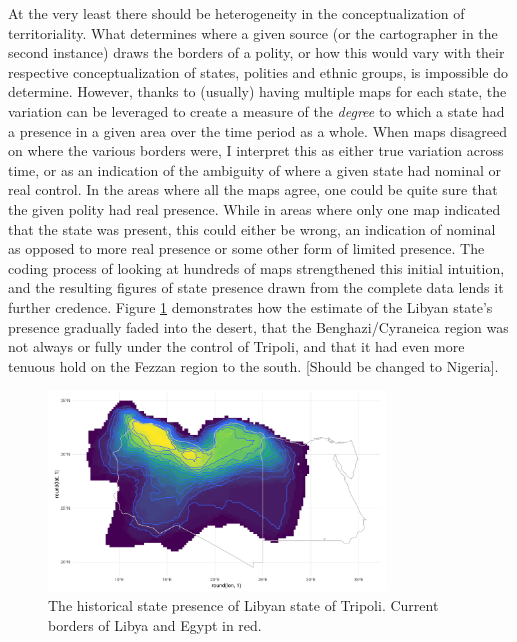 \documentclass[12pt]{article}
\begin{document}
At the very least there should be heterogeneity in the conceptualization of
territoriality. What determines where a given source (or the cartographer in the
second instance) draws the borders of a polity, or how this would vary with
their respective conceptualization of states, polities and ethnic groups, is
impossible do determine. However, thanks to (usually) having multiple maps for
each state, the variation can be leveraged to create a measure of the
\textit{degree} to which a state had a presence in a given area over the time
period as a whole. When maps disagreed on where the various borders were, I
interpret this as either true variation across time, or as an indication of the
ambiguity of where a given state had nominal or real control. In the areas where
all the maps agree, one could be quite sure that the given polity had real
presence.  While in areas where only one map indicated that the state was
present, this could either be wrong, an indication of nominal as opposed to more
real presence or some other form of limited presence. The coding process of
looking at hundreds of maps strengthened this initial intuition, and the
resulting figures of state presence drawn from the complete data lends it
further credence. Figure \ref{libya} demonstrates how the estimate
of the Libyan state's presence gradually faded into the desert, that the
Benghazi/Cyraneica region was not always or fully under the control of Tripoli,
and that it had even more tenuous hold on the Fezzan region to the south.
[Should be changed to Nigeria].


\begin{figure}[htpb]
	\centering
	\includegraphics[width=0.8\textwidth,keepaspectratio]{../R/Output/libya.pdf}
	\caption{The historical state presence of Libyan state of Tripoli.
	Current borders of Libya and Egypt in red.}
	\label{libya}
\end{figure}
\end{document}
